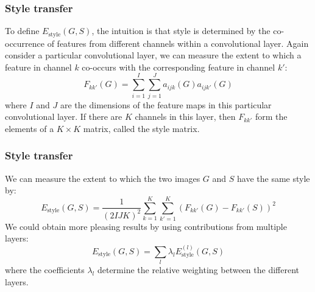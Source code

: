 \documentclass{beamer}
\begin{document}
\begin{frame}
    \frametitle{Style transfer}
    To define $E_{\textrm{style}}(G,S)$, the intuition is that style is determined by the co-occurrence of features from different channels within a convolutional layer. Again consider a particular convolutional layer, we can measure the extent to which a feature in channel $k$ co-occurs with the corresponding feature in channel $k'$:
    \begin{equation*}
        F_{kk'}(G)=\sum_{i=1}^{I}\sum_{j=1}^{J}a_{ijk}(G)a_{ijk'}(G)
    \end{equation*}
    where $I$ and $J$ are the dimensions of the feature maps in this particular convolutional layer. If there are $K$ channels in this layer, then $F_{kk'}$ form the elements of a $K\times{}K$ matrix, called the style matrix.
\end{frame}

\begin{frame}
    \frametitle{Style transfer}
    We can measure the extent to which the two images $G$ and $S$ have the same style by:
    \begin{equation*}
        E_{\textrm{style}}(G,S)=\frac{1}{(2IJK)^{2}}\sum_{k=1}^{K}\sum_{k'=1}^{K}(F_{kk'}(G)-F_{kk'}(S))^{2}
    \end{equation*}
    We could obtain more pleasing results by using contributions from multiple layers:
    \begin{equation*}
        E_{\textrm{style}}(G,S)=\sum_{l}\lambda_{l}E^{(l)}_{\textrm{style}}(G,S)
    \end{equation*}
    where the coefficients $\lambda_{l}$ determine the relative weighting between the different layers.
\end{frame}
\end{document}
